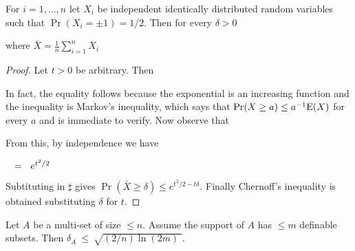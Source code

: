 \documentclass[sputnik.tex]{subfiles}
\begin{document}
\begin{lemma}\label{Chernoff}
For $i=1,\dots,n$ let $X_i$ be independent identically distributed random variables such that\/ $\Pr(X_i=\pm1)=1/2$.
Then for every $\delta>0$

\hfill where $\displaystyle \bar X=\frac1n\sum^n_{i=1}X_i$
\end{lemma}
\begin{proof}
Let $t>0$ be arbitrary.
Then



In fact, the equality follows because the exponential is an increasing function and the inequality is Markov's inequality, which says that $\Pr(X\ge a)\le a^{-1}{\rm E}(X)$ for every $a$ and is immediate to verify.
Now observe that






From this, by independence we have 

$\medrel{=}e^{t^2/2}$


Subtituting in $\sharp$ gives $\Pr(\bar X\ge\delta)\le e^{t^2/2-t\delta}$.
Finally Chernoff's inequality is obtained substituting $\delta$ for $t$.
\end{proof}


\begin{lemma}\label{lem_discrepanzarandom} 
Let $A$ be a multi-set of size $\le n$. Assume the support of $A$ has $\le m$  definable subsets. Then $\delta_A\ \le\ \sqrt{(2/n)\ln(2m)\;}$.
\end{lemma}
\end{document}
